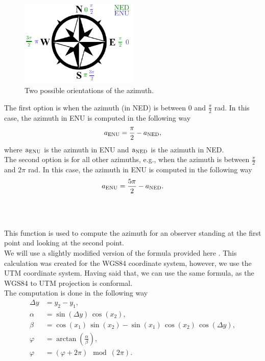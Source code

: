             \begin{figure}[ht]
                \centering
                \includegraphics[width=0.5\textwidth]{images/direction_indicator.pdf}
                \caption{Two possible orientations of the azimuth.}
                \label{fig:dir_indi}
            \end{figure}
            \noindent The first option is when the azimuth (in NED) is between 0 and $\frac{\pi}{2}$ rad. In this case, the azimuth in ENU is computed in the following way
            \begin{equation}
                a_{\rm{ENU}} = \frac{\pi}{2} - a_{\rm{NED}},
            \end{equation}
            where $\text{a}_{\rm{ENU}}$ is the azimuth in ENU and $\text{a}_{\rm{NED}}$ is the azimuth in NED.\\
            The second option is for all other azimuths, e.g., when the azimuth is between $\frac{\pi}{2}$ and $2\pi$ rad. In this case, the azimuth in ENU is computed in the following way
            \begin{equation}
                a_{\rm{ENU}} = \frac{5\pi}{2} - a_{\rm{NED}}.
            \end{equation}\\\\
        \\
            This function is used to compute the azimuth for an observer standing at the first point and looking at the second point.\\
            We will use a slightly modified version of the formula provided here \cite{calc_bearing}. This calculation was created for the WGS84 coordinate system, however, we use the UTM coordinate system. Having said that, we can use the same formula, as the WGS84 to UTM projection is conformal\cite{Map_projections}.\\
            The computation is done in the following way
            \begin{align}
                \Delta y &= y_{2} - y_{1}, \\
                \alpha &= \sin{(\Delta y)}\,\cos{(x_{2})}, \\
                \beta &= \cos{(x_{1})}\,\sin{(x_{2})} - \sin{(x_{1})}\,\cos{(x_{2})}\,\cos{(\Delta y)}, \\
                \varphi &= \arctan{\left(\frac{\alpha}{\beta}\right)}, \\
                \varphi &= (\varphi + 2\pi) \mod (2\pi).
            \end{align}
